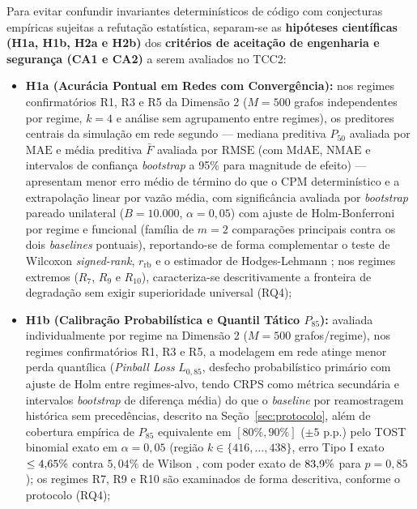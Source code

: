 \documentclass[12pt,openany,oneside,a4paper,english,brazilian,sumario=tradicional]{abntex2}
\begin{document}
Para evitar confundir invariantes determinísticos de código com conjecturas empíricas sujeitas a refutação estatística, separam-se as \textbf{hipóteses científicas (H1a, H1b, H2a e H2b)} dos \textbf{critérios de aceitação de engenharia e segurança (CA1 e CA2)} a serem avaliados no TCC2:

\begin{itemize}
  \item \textbf{H1a (Acurácia Pontual em Redes com Convergência):} nos regimes confirmatórios R1, R3 e R5 da Dimensão 2 ($M=500$ grafos independentes por regime, $k=4$ e análise sem agrupamento entre regimes), os preditores centrais da simulação em rede segundo  --- mediana preditiva $P_{50}$ avaliada por $\mathrm{MAE}$ e média preditiva $\bar{F}$ avaliada por $\mathrm{RMSE}$ (com $\mathrm{MdAE}$, $\mathrm{NMAE}$ e intervalos de confiança \textit{bootstrap} a 95\% para magnitude de efeito) --- apresentam menor erro médio de término do que o CPM determinístico e a extrapolação linear por vazão média, com significância avaliada por \textit{bootstrap} pareado unilateral ($B=10.000$, $\alpha=0{,}05$) com ajuste de Holm-Bonferroni \cite{holm1979} por regime e funcional (família de $m=2$ comparações principais contra os dois \textit{baselines} pontuais), reportando-se de forma complementar o teste de Wilcoxon \textit{signed-rank}, $r_{\mathrm{rb}}$ e o estimador de Hodges-Lehmann \cite{hodges1963}; nos regimes extremos ($R_7$, $R_9$ e $R_{10}$), caracteriza-se descritivamente a fronteira de degradação sem exigir superioridade universal (RQ4);
  \item \textbf{H1b (Calibração Probabilística e Quantil Tático $P_{85}$):} avaliada individualmente por regime na Dimensão 2 ($M=500$ grafos/regime), nos regimes confirmatórios R1, R3 e R5, a modelagem em rede atinge menor perda quantílica (\textit{Pinball Loss} $L_{0{,}85}$, desfecho probabilístico primário com ajuste de Holm \cite{holm1979} entre regimes-alvo, tendo $\mathrm{CRPS}$ como métrica secundária e intervalos \textit{bootstrap} de diferença média) do que o \textit{baseline} por reamostragem histórica sem precedências, descrito na Seção~\ref{sec:protocolo}, além de cobertura empírica de $P_{85}$ equivalente em $[80\%, 90\%]$ ($\pm 5$ p.p.) pelo TOST binomial exato \cite{schuirmann1987,clopper1934} em $\alpha=0{,}05$ (região $k \in \{416,\dots,438\}$, erro Tipo I exato $\le 4{,}65{}\%$ contra $5{,}04\%$ de Wilson \cite{wilson1927}, com poder exato de $83{,}9{}\%$ para $p=0{,}85$); os regimes R7, R9 e R10 são examinados de forma descritiva, conforme o protocolo (RQ4);

\end{itemize}
\end{document}
